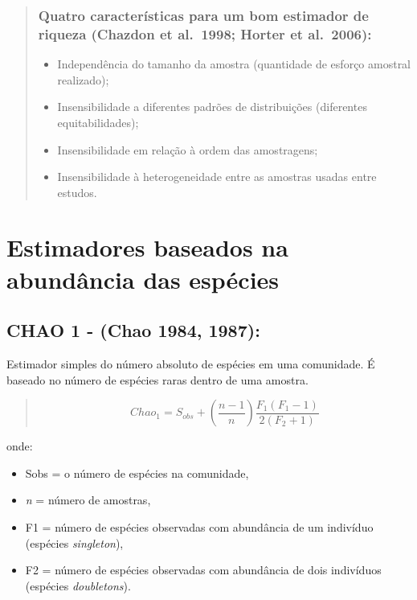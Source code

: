 \documentclass[
]{book}
\providecommand{\tightlist}{%
  \setlength{\itemsep}{0pt}\setlength{\parskip}{0pt}}
\begin{document}
\begin{quote}
\hypertarget{quatro-caracteruxedsticas-para-um-bom-estimador-de-riqueza-chazdon-et-al.-1998-horter-et-al.-2006}{%
\subsubsection{Quatro características para um bom estimador de riqueza (Chazdon et al.~1998; Horter et al.~2006):}\label{quatro-caracteruxedsticas-para-um-bom-estimador-de-riqueza-chazdon-et-al.-1998-horter-et-al.-2006}}

\begin{itemize}
\tightlist
\item
  Independência do tamanho da amostra (quantidade de esforço amostral realizado);
\item
  Insensibilidade a diferentes padrões de distribuições (diferentes equitabilidades);
\item
  Insensibilidade em relação à ordem das amostragens;
\item
  Insensibilidade à heterogeneidade entre as amostras usadas entre estudos.
\end{itemize}
\end{quote}

\hypertarget{estimadores-baseados-na-abunduxe2ncia-das-espuxe9cies}{%
\section{Estimadores baseados na abundância das espécies}\label{estimadores-baseados-na-abunduxe2ncia-das-espuxe9cies}}

\hypertarget{chao-1---chao-1984-1987}{%
\subsection{CHAO 1 - (Chao 1984, 1987):}\label{chao-1---chao-1984-1987}}

Estimador simples do número absoluto de espécies em uma comunidade. É baseado no número de espécies raras dentro de uma amostra.

\begin{quote}
\[Chao_{1} = S_{obs} + \left(\frac{n-1}{n}\right)\frac{F_1(F_1-1)}{2(F_2+1)}\]
\end{quote}

onde:

\begin{itemize}
\item
  Sobs = o número de espécies na comunidade,
\item
  \emph{n} = número de amostras,
\item
  F1 = número de espécies observadas com abundância de um indivíduo (espécies \emph{singleton}),
\item
  F2 = número de espécies observadas com abundância de dois indivíduos (espécies \emph{doubletons}).
\end{itemize}
\end{document}
